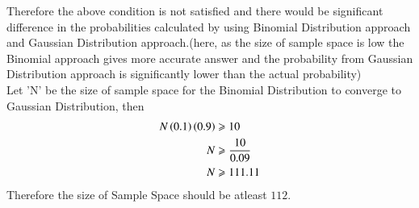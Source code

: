 \documentclass[journal,12pt,twocolumn]{IEEEtran}
\begin{document}
\begin{enumerate}[label=(\Roman*), align=left]
Therefore the above condition is not satisfied and there would be significant difference in the probabilities calculated by using Binomial Distribution approach and Gaussian Distribution approach.(here, as the size of sample space is low the Binomial approach gives more accurate answer and the probability from Gaussian Distribution approach is significantly lower than the actual probability)
\\Let 'N' be the size of sample space for the Binomial Distribution to converge to Gaussian Distribution, then
\begin{align}
    N\left(0.1\right)\left(0.9\right)&\geqslant 10\nonumber\\
    N&\geqslant \frac{10}{0.09}\nonumber\\
    N&\geqslant 111.11
    \end{align}
Therefore the size of Sample Space should be atleast $112$.
\end{enumerate}
\end{document}
